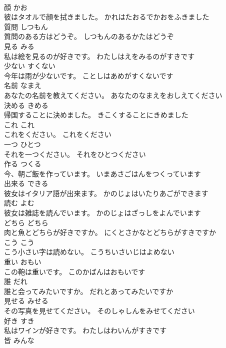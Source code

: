 \documentclass[8pt]{extreport}
\begin{document}
\begin{CJK}{UTF8}{min}
\\	顔	かお	
\\	彼はタオルで顔を拭きました。	かれはたおるでかおをふきました	
\\	質問	しつもん	
\\	質問のある方はどうぞ。	しつもんのあるかたはどうぞ	
\\	見る	みる	
\\	私は絵を見るのが好きです。	わたしはえをみるのがすきです	
\\	少ない	すくない	
\\	今年は雨が少ないです。	ことしはあめがすくないです	
\\	名前	なまえ	
\\	あなたの名前を教えてください。	あなたのなまえをおしえてください	
\\	決める	きめる	
\\	帰国することに決めました。	きこくすることにきめました	
\\	これ	これ	
\\	これをください。	これをください	
\\	一つ	ひとつ	
\\	それを一つください。	それをひとつください	
\\	作る	つくる	
\\	今、朝ご飯を作っています。	いまあさごはんをつくっています	
\\	出来る	できる	
\\	彼女はイタリア語が出来ます。	かのじょはいたりあごができます	
\\	読む	よむ	
\\	彼女は雑誌を読んでいます。	かのじょはざっしをよんでいます	
\\	どちら	どちら	
\\	肉と魚とどちらが好きですか。	にくとさかなとどちらがすきですか	
\\	こう	こう	
\\	こう小さい字は読めない。	こうちいさいじはよめない	
\\	重い	おもい	
\\	この鞄は重いです。	このかばんはおもいです	
\\	誰	だれ	
\\	誰と会ってみたいですか。	だれとあってみたいですか	
\\	見せる	みせる	
\\	その写真を見せてください。	そのしゃしんをみせてください	
\\	好き	すき	
\\	私はワインが好きです。	わたしはわいんがすきです	
\\	皆	みんな	

\end{CJK}
\end{document}
